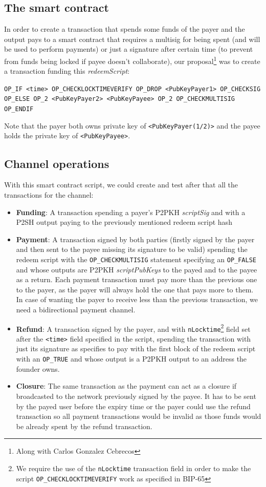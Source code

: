 \documentclass[12pt,journal,compsoc]{IEEEtran}
\newcommand{\code}[1]{\texttt{#1}}
\begin{document}
\subsection{The smart contract}
In order to create a transaction that spends some funds of the payer and the output pays to a smart contract that requires a multisig for being spent (and will be used to perform payments) or just a signature after certain time (to prevent from funds being locked if payee doesn't collaborate), our proposal\footnote{Along with Carlos Gonzalez Cebrecos} was to create a transaction funding this \textit{redeemScript}:
\begin{center}
\code{OP\_IF <time> OP\_CHECKLOCKTIMEVERIFY OP\_DROP <PubKeyPayer1> OP\_CHECKSIG OP\_ELSE OP\_2 <PubKeyPayer2> <PubKeyPayee> OP\_2 OP\_CHECKMULTISIG OP\_ENDIF}
\end{center}
Note that the payer both owns private key of \code{<PubKeyPayer(1/2)>} and the payee holds the private key of \code{<PubKeyPayee>}. 
\subsection{Channel operations}
With this smart contract script, we could create and test after that all the transactions for the channel:
\begin{itemize}
    \item \textbf{Funding}: A transaction spending a payer's P2PKH \textit{scriptSig} and with a P2SH output paying to the previously mentioned redeem script hash
    \item \textbf{Payment}: A transaction signed by both parties (firstly signed by the payer and then sent to the payee missing its signature to be valid) spending the redeem script with the \code{OP\_CHECKMULTISIG} statement specifying an \code{OP\_FALSE} and whose outputs are P2PKH \textit{scriptPubKeys} to the payed and to the payee as a return. Each payment transaction must pay more than the previous one to the payer, as the payer will always hold the one that pays more to them. In case of wanting the payer to receive less than the previous transaction, we need a bidirectional payment channel.
    \item \textbf{Refund}: A transaction signed by the payer, and with \code{nLocktime}\footnote{We require the use of the \code{nLocktime} transaction field in order to make the script \code{OP\_CHECKLOCKTIMEVERIFY} work as specified in BIP-65\cite{bip-65:online}} field set after the \code{<time>} field specified in the script, spending the transaction with just its signature as specifies to pay with the first block of the redeem script with an \code{OP\_TRUE} and whose output is a P2PKH output to an address the founder owns.
    \item \textbf{Closure}: The same transaction as the payment can act as a closure if broadcasted to the network previously signed by the payee. It has to be sent by the payed user before the expiry time or the payer could use the refund transaction so all payment transactions would be invalid as those funds would be already spent by the refund transaction.
\end{itemize}
\end{document}
